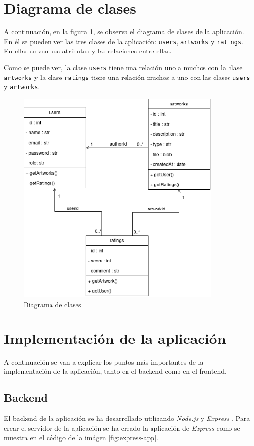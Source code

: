 \section{Diagrama de clases}
A continuación, en la figura \ref{fig:class-diagram}, se observa el diagrama de clases
de la aplicación. En él se pueden ver las tres clases de la aplicación: \texttt{users},
\texttt{artworks} y \texttt{ratings}. En ellas se ven sus atributos y las relaciones
entre ellas.

Como se puede ver, la clase \texttt{users} tiene una relación uno a muchos
con la clase \texttt{artworks} y la clase \texttt{ratings} tiene una relación muchos a
uno con las clases \texttt{users} y \texttt{artworks}.

\begin{figure}[H]
  \centering
  \includegraphics[width=0.9\textwidth]{diagramas/diagrama_clases}
  \caption{Diagrama de clases}
  \label{fig:class-diagram}
\end{figure}

\section{Implementación de la aplicación}
A continuación se van a explicar los puntos más importantes de la implementación de la
aplicación, tanto en el backend como en el frontend.

\subsection{Backend}
El backend de la aplicación se ha desarrollado utilizando \textit{Node.js} \cite{nodejs}
y \textit{Express} \cite{express}. Para crear el servidor de la aplicación se ha creado
la aplicación de \textit{Express} como se muestra en el código de la imágen
\ref{fig:express-app}.

